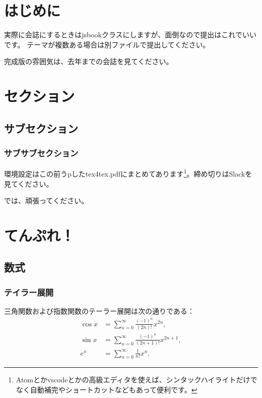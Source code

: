 \documentclass[11pt,b5paper,papersize,dvipdfmx]{jsbook}
\begin{document}



%
\section*{はじめに}
実際に会誌にするときはjsbookクラスにしますが、面倒なので提出はこれでいいです。
テーマが複数ある場合は別ファイルで提出してください。\par
完成版の雰囲気は、去年までの会誌を見てください。

%
\section{セクション}
\subsection{サブセクション}
\subsubsection{サブサブセクション}
環境設定はこの前うpしたtex4tex.pdfにまとめてあります\footnote{Atomとかvscodeとかの高級エディタを使えば、シンタックハイライトだけでなく自動補完やショートカットなどもあって便利です。}。締め切りはSlackを見てください。\par
では、頑張ってください。

%
\section{てんぷれ！}

%
\subsection{数式}

%
\subsubsection{テイラー展開}
三角関数および指数関数のテーラー展開は次の通りである：
\begin{align}
    \cos x &= \sum_{n=0}^\infty \frac{(-1)^n}{(2n)!} x^{2n}, \label{eq:cos}\\
    \sin x &= \sum_{n=0}^\infty \frac{(-1)^n}{(2n+1)!} x^{2n+1}, \label{eq:sin}\\
    e^x &= \sum_{n=0}^\infty \frac{1}{n!} x^n. \label{eq:exp}
\end{align}
\end{document}
